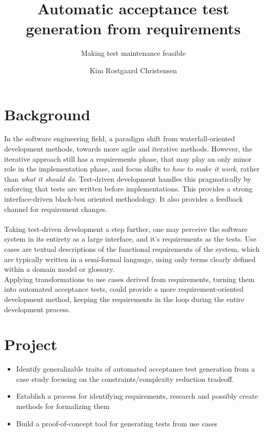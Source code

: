\documentclass[10pt]{scrartcl}
\author{Kim Rostgaard Christensen}
\title{Automatic acceptance test generation from requirements}
\subtitle{Making test maintenance feasible}
\begin{document}
\maketitle

\section{Background}
In the software engineering field, a paradigm shift from waterfall-oriented development methods, towards more agile and iterative methods. However, the iterative approach still has a requirements phase, that may play an only minor role in the implementation phase, and focus shifts to \emph{how to make it work}, rather than \emph{what it should do}. Test-driven development handles this pragmatically by enforcing that tests are written before implementations. This provides a strong interface-driven black-box oriented methodology. It also provides a feedback channel for requirement changes.\\\\
Taking test-driven development a step further, one may perceive the software system in its entirety as a large interface, and it's requirements as the tests. Use cases are textual descriptions of the functional requirements of the system, which are typically written in a semi-formal language, using only terms clearly defined within a domain model or glossary.\\
Applying transformations to use cases derived from requirements, turning them into automated acceptance tests, could provide a more requirement-oriented development method, keeping the requirements in the loop during the entire development process.

\section{Project}
\begin{itemize}
  \item Identify generalizable traits of automated acceptance test generation from a case study focusing on the constraints/complexity reduction tradeoff.
  \item Establish a process for identifying requirements, research and possibly create methods for formalizing them
  \item Build a proof-of-concept tool for generating tests from use cases
\end{itemize}

\end{document}
